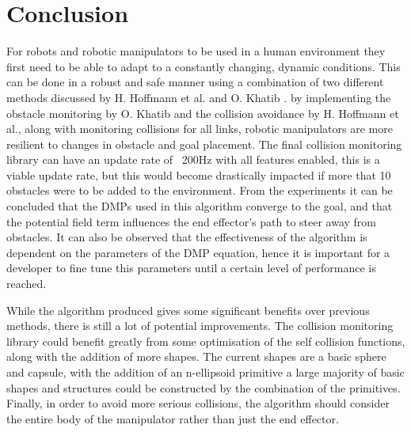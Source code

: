 \documentclass[a4paper, 10pt, conference]{ieeeconf}      %
\begin{document}
\section{Conclusion} %
For robots and robotic manipulators to be used in a human environment they first need to be able to adapt to a constantly changing, dynamic conditions. This can be done in a robust and safe manner using a combination of two different methods discussed by H. Hoffmann et al.\cite{Hoffmann} and O. Khatib \cite{Khatib}. by implementing the obstacle monitoring by O. Khatib \cite{Khatib} and the collision avoidance by H. Hoffmann et al.\cite{Hoffmann}, along with monitoring collisions for all links, robotic manipulators are more resilient to changes in obstacle and goal placement. The final collision monitoring library can have an update rate of ~200Hz with all features enabled, this is a viable update rate, but this would become drastically impacted if more that 10 obstacles were to be added to the environment. %
From the experiments it can be concluded that the DMPs used in this algorithm converge to the goal, and that the potential field term influences the end effector's path to steer away from obstacles. 
It can also be observed that the effectiveness of the algorithm is dependent on the parameters of the DMP equation, hence it is important for a developer to fine tune this parameters until a certain level of performance is reached.
 
While the algorithm produced gives some significant benefits over previous methods, there is still a lot of potential improvements. The collision monitoring library could benefit greatly from some optimisation of the self collision functions, along with the addition of more shapes. The current shapes are a basic sphere and capsule, with the addition of an n-ellipsoid primitive a large majority of basic shapes and structures could be constructed by the combination of the primitives. %
Finally, in order to avoid more serious collisions, the algorithm should consider the entire body of the manipulator rather than just the end effector. 

\end{document}
